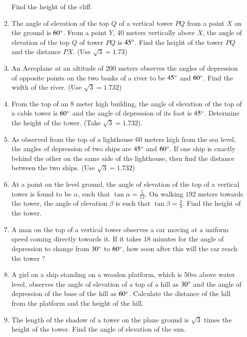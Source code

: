 \begin{enumerate}[label=\thesubsection.\arabic*.,ref=\thesubsection.\theenumi]
\begin{figure}[H]
        \caption{}
        \label{fig:boat.jpeg}
    \end{figure}
    Find the height of the cliff.
    \hfill{}\item The angle of elevation of the top $Q$ of a vertical tower $PQ$ from a point $X$ on the ground is $60\degree$. From a point $Y$, $40$ meters vertically above $X$, the angle of elevation of the top $Q$ of tower $PQ$ is $45\degree$. Find the height of the tower $PQ$ and the distance $PX$. (Use $\sqrt{3} = 1.73$)
    \hfill{}\item An Aeroplane at an altitude of $200$ meters observes the angles of depression of opposite points on the two banks of a river to be $45\degree$ and $60\degree$. Find the width of the river. (Use $\sqrt{3} = 1.732$)
%
    \hfill{}\item From the top of an $8$ meter high building, the angle of elevation of the top of a cable tower is $60\degree$ and the angle of depression of its foot is $45\degree$. Determine the height of the tower. (Take $\sqrt{3} = 1.732$).
%
    \hfill{}\item As observed from the top of a lighthouse $60$ meters high from the sea level, the angles of depression of two ships are $45\degree$ and $60\degree$. If one ship is exactly behind the other on the same side of the lighthouse, then find the distance between the two ships. (Use $\sqrt{3} = 1.732$)
%
    \hfill{}\item At a point on the level ground, the angle of elevation of the top of a vertical tower is found to be $\alpha$, such that $\tan\alpha = \frac{5}{12}$. On walking $192$ meters towards the tower, the angle of elevation $\beta$ is such that $\tan\beta = \frac{3}{4}$. Find the height of the tower.
%
    \hfill{}
\item A man on the top of a vertical tower observes a car moving at a uniform speed coming directly towards it. If it takes $18$ minutes for the angle of depression to change from $30\degree$ to $60\degree$, how soon after this will the car reach the tower ?
%
		\hfill{}\item A girl on a ship standing on a wooden platform, which is $50m$ above water level, observes the angle of elevation of a top of a hill as $30\degree$ and the angle of depression of the base of the hill as $60\degree$. Calculate the distance of the hill from the platform and the height of the hill.
\hfill{}
%
\item The length of the shadow of a tower on the plane ground is $\sqrt{3}$ times the height of the tower. Find the angle of elevation of the sun.

\end{enumerate}
